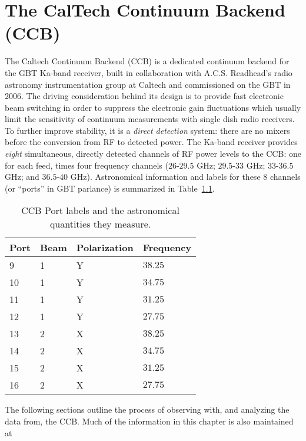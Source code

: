 \chapter{The CalTech Continuum Backend (CCB)}\label{chap:ccb}

The Caltech Continuum Backend (CCB) is a dedicated continuum backend
for the GBT Ka-band receiver, built in collaboration with
A.C.S. Readhead's radio astronomy instrumentation group at Caltech and
commissioned on the GBT in 2006. The driving consideration behind its
design is to provide fast electronic beam switching in order to
suppress the electronic gain fluctuations which usually limit the
sensitivity of continuum measurements with single dish radio
receivers. To further improve stability, it is a {\it direct
  detection} system: there are no mixers before the conversion from RF
to detected power. The Ka-band receiver provides {\it eight}
simultaneous, directly detected channels of RF power levels to the
CCB: one for each feed, times four frequency channels ($26$-$29.5$
GHz; $29.5$-$33$ GHz; $33$-$36.5$ GHz; and $36.5$-$40$
GHz). Astronomical information and labels for these 8 channels (or
``ports'' in GBT parlance) is summarized in Table~\ref{tbl:ccbports}.

\begin{table}
\begin{center}
\begin{tabular}{llll}
Port & Beam & Polarization & Frequency \\ \toprule
9 &  1 & Y & $38.25$ \\
10 & 1 & Y & $34.75$ \\
11 & 1 & Y & $31.25$ \\
12 & 1 & Y & $27.75$ \\
13 & 2 & X & $38.25$ \\
14 & 2 & X & $34.75$ \\
15 & 2 & X & $31.25$ \\
16 & 2 & X & $27.75$ \\ \bottomrule
\end{tabular}
\caption[CCB Port labels and the astronomical quantities they measure]
{CCB Port labels and the astronomical quantities they measure.\label{tbl:ccbports}}
\end{center}
\end{table}

The following sections outline the process of observing with, and
analyzing the data from, the CCB. Much of the information in this
chapter is also maintained at 

